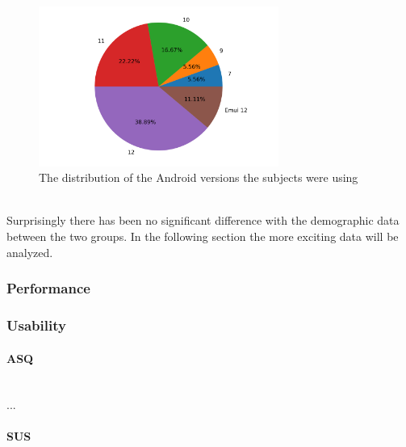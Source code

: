 \begin{figure}[htb]
  \centering
  \includegraphics[width=0.7\textwidth]{Evaluation/img/droid_version.png}
  \caption{The distribution of the Android versions the subjects were using}\label{fig:android_version}
\end{figure}

\mbox{}\\
Surprisingly there has been no significant difference with the demographic data between the two groups.
In the following section the more exciting data will be analyzed. 
\subsubsection{Performance}
\subsubsection{Usability}
\paragraph{ASQ}\mbox{}\\
...
\paragraph{SUS}\mbox{}\\
\begin{table}[htb]
  \caption{The \gls{sus}-scores from all 18 subjects. The first row contains the \gls{sus}-scores for the desktop application and the second row for the mobile application. The figures have been rounded to whole numbers.}
  \end{table}

